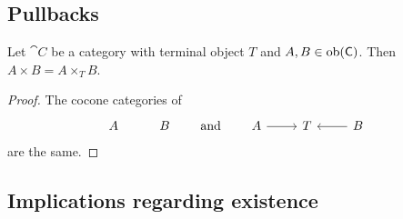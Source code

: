 \subsection{Pullbacks}
\begin{definition}

\end{definition}

\begin{lemma} \label{productAsPullback}
Let $\cat{C}$ be a category with terminal object $T$ and $A,B\in\operatorname{ob}(\mathsf{C})$. Then $A\times B = A\times_T B$.
\end{lemma}
\begin{proof}
The cocone categories of
\[ \begin{tikzcd}
A & B
\end{tikzcd} \qquad\text{and}\qquad \begin{tikzcd}
A \ar[r] & T & \ar[l] B
\end{tikzcd} \]
are the same.
\end{proof}


\subsection{Implications regarding existence}

